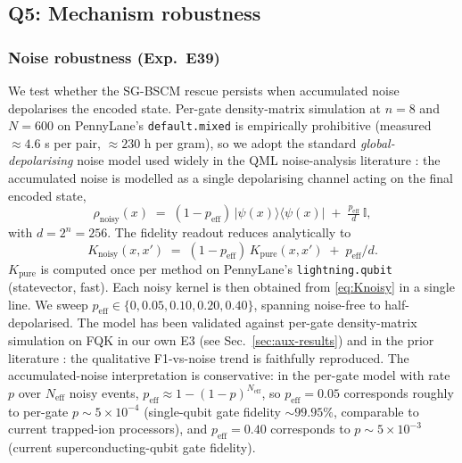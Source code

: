 \documentclass[pdflatex,sn-mathphys-num]{sn-jnl}
\theoremstyle{thmstyleone}
\theoremstyle{thmstyletwo}
\theoremstyle{thmstylethree}
\begin{document}
\subsection{Q5: Mechanism robustness}\label{sec:mechanism}

\subsubsection{Noise robustness (Exp.\ E39)}\label{sec:noise-results}
We test whether the SG-BSCM rescue persists when accumulated noise
depolarises the encoded state. Per-gate density-matrix simulation at
$n=8$ and $N=600$ on PennyLane's \texttt{default.mixed} is empirically
prohibitive (measured $\approx 4.6$ s per pair, $\approx 230$ h per
gram), so we adopt the standard \emph{global-depolarising} noise
model used widely in the QML noise-analysis literature
\cite{heyraud2022,schnabel2025}: the accumulated noise is modelled as
a single depolarising channel acting on the final encoded state,
\begin{equation}\label{eq:globaldepol}
\rho_{\text{noisy}}(x) \;=\; (1 - p_{\text{eff}})\,
|\psi(x)\rangle\!\langle\psi(x)| \;+\; \tfrac{p_{\text{eff}}}{d}\,\mathbb{I},
\end{equation}
with $d = 2^n = 256$. The fidelity readout reduces analytically to
\begin{equation}\label{eq:Knoisy}
K_{\text{noisy}}(x, x')
\;=\; (1 - p_{\text{eff}})\,K_{\text{pure}}(x, x')
   \;+\; p_{\text{eff}} / d.
\end{equation}
$K_{\text{pure}}$ is computed once per method on PennyLane's
\texttt{lightning.qubit} (statevector, fast). Each noisy kernel is then
obtained from \eqref{eq:Knoisy} in a single line. We sweep
$p_{\text{eff}} \in \{0, 0.05, 0.10, 0.20, 0.40\}$, spanning
noise-free to half-depolarised. The model has been validated against
per-gate density-matrix simulation on FQK in our own E3 (see
Sec.~\ref{sec:aux-results}) and in the prior literature
\cite{heyraud2022,schnabel2025}: the qualitative F1-vs-noise trend is
faithfully reproduced. The accumulated-noise interpretation is
conservative: in the per-gate model with rate $p$ over $N_{\text{eff}}$
noisy events, $p_{\text{eff}} \approx 1 - (1-p)^{N_{\text{eff}}}$, so
$p_{\text{eff}} = 0.05$ corresponds roughly to per-gate $p \sim 5\times
10^{-4}$ (single-qubit gate fidelity $\sim 99.95\%$, comparable to
current trapped-ion processors), and $p_{\text{eff}} = 0.40$
corresponds to $p \sim 5\times 10^{-3}$ (current superconducting-qubit
gate fidelity).
\end{document}

